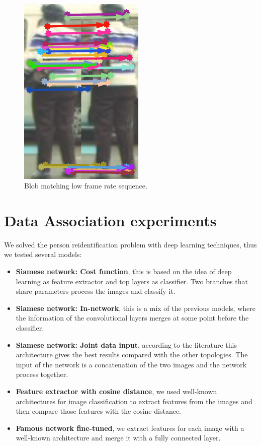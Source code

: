 \begin{figure}[H]
\centering         
\includegraphics[width=6cm]{lucasKanade/matchinBo.png}
\caption{Blob matching low frame rate sequence.} \label{fails2}
\end{figure}



\section{Data Association experiments}\label{exper:entrenar}


We solved the person reidentification problem with deep learning techniques, thus we tested several models:


\begin{itemize}


\item \textbf{Siamese network: Cost function}, this is based on the idea of deep learning as feature extractor and top layers as classifier. Two branches that share parameters process the images and classify it.

\item \textbf{Siamese network: In-network}, this is a mix of the previous models, where the information of the convolutional layers merges at some point before the classifier.

\item \textbf{Siamese network: Joint data input}, according to the literature this architecture gives the best results compared with the other topologies. The input of the network is a concatenation of the two images and the network process together.


\item \textbf{Feature extractor with cosine distance}, we used well-known architectures for image classification to extract features from the images and then compare those features with the cosine distance.

\item \textbf{Famous network fine-tuned}, we extract features for each image with a well-known architecture and merge it with a fully connected layer.

\end{itemize}

